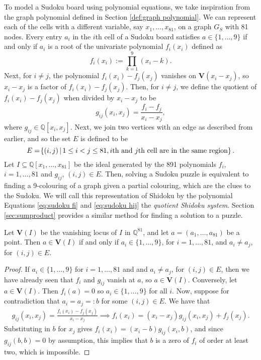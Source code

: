 \documentclass[../main.tex]{subfiles}
\begin{document}
        To model a Sudoku board using polynomial equations, we take inspiration from the graph polynomial defined in Section \ref{def:graph polynomial}. We can represent each of the cells with a different variable, say $x_1,\dots,x_{81}$, on a graph $G_S$ with 81 nodes. Every entry $a_i$ in the $i$th cell of a Sudoku board satisfies $a\in \{1,\dots,9\}$ if and only if $a_i$ is a root of the univariate polynomial $f_i(x_i)$ defined as 
        \begin{equation} \label{eq:sudoku fi}
            f_i(x_i) := \prod^9_{k=1}(x_i-k).
        \end{equation}
        Next, for $i\neq j$, the polynomial $f_i(x_i)-f_j(x_j)$ vanishes on $\mathbf{V}(x_i-x_j)$, so $x_i-x_j$ is a factor of $f_i(x_i)-f_j(x_j)$. Then, for $i\neq j$, we define the quotient of $f_i(x_i)-f_j(x_j)$ when divided by $x_i-x_j$ to be
        \begin{equation} \label{eq:sudoku hij}
            g_{ij} (x_i,x_j) = \frac{f_i-f_j}{x_i-x_j},
        \end{equation}
        where $g_{ij}\in \mathbb{Q}[x_i,x_j]$. Next, we join two vertices with an edge as described from earlier, and so the set $E$ is defined to be
        $$E = \lr\{\}{(i,j) \, | \, 1\leq i < j\leq 81, \text{$i$th and $j$th cell are in the same region}}.$$
        Let $I\subseteq\mathbb{Q}[x_1,\dots,x_{81}]$ be the ideal generated by the 891 polynomials $f_i$, $i=1,\dots,81$ and $g_{ij}$, $(i,j)\in E$. Then, solving a Sudoku puzzle is equivalent to finding a 9-colouring of a graph given a partial colouring, which are the clues to the Sudoku. We will call this representation of Shidoku by the polynomial Equations \ref{eq:sudoku fi} and \ref{eq:sudoku hij} the \emph{quotient Shidoku system}. Section \ref{sec:sumproduct} provides a similar method for finding a solution to a puzzle.

        \begin{proposition} \label{prop:solution}
            Let $\mathbf{V}(I)$ be the vanishing locus of $I$ in $\mathbb{Q}^{81}$, and let $a=(a_1,\dots,a_{81})$ be a point. Then $a\in \mathbf{V}(I)$ if and only if $a_i\in \{1,\dots,9\}$, for $i=1,\dots,81$, and $a_i\neq a_j$, for $(i,j)\in E$.
        \end{proposition}
        \begin{proof}
            If $a_i\in \{1,\dots,9\}$ for $i=1,\dots,81$ and and $a_i\neq a_j$, for $(i,j)\in E$, then we have already seen that $f_i$ and $g_{ij}$ vanish at $a$, so $a\in \mathbf{V}(I)$. Conversely, let $a\in \mathbf{V}(I)$. Then $f_i(a)=0$ so $a_i\in\{1,\dots,9\}$ for all $i$. Now, suppose for contradiction that $a_i=a_j=:b$ for some $(i,j)\in E$. 
            We have that 
            \begin{align*}
                g_{ij}(x_i,x_j) = \frac{f_i(x_i) -f_j(x_j)}{x_i-x_j} \implies f_i(x_i) = (x_i-x_j)g_{ij}(x_i,x_j) + f_j(x_j).
            \end{align*}
            Substituting in $b$ for $x_j$ gives $f_i(x_i)=(x_i-b)g_{ij}(x_i,b)$, and since $g_{ij}(b,b)=0$ by assumption, this implies that $b$ is a zero of $f_i$ of order at least two, which is impossible.
        \end{proof}
\end{document}
